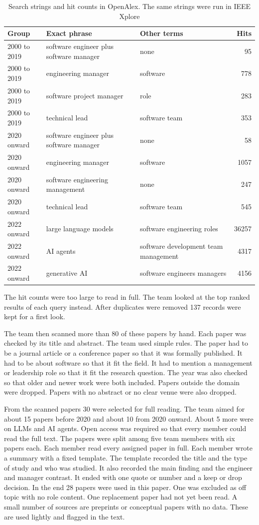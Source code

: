 \documentclass[conference]{IEEEtran}
\begin{document}
\begin{table}[!t]
\caption{Search strings and hit counts in OpenAlex. The same strings were run in IEEE Xplore}
\centering\footnotesize
\begin{tabular}{p{1.4cm}p{3cm}p{2.1cm}r}
\hline
Group & Exact phrase & Other terms & Hits \\ \hline
2000 to 2019 & software engineer plus software manager & none & 95 \\
2000 to 2019 & engineering manager & software & 778 \\
2000 to 2019 & software project manager & role & 283 \\
2000 to 2019 & technical lead & software team & 353 \\
2020 onward & software engineer plus software manager & none & 58 \\
2020 onward & engineering manager & software & 1057 \\
2020 onward & software engineering management & none & 247 \\
2020 onward & technical lead & software team & 545 \\
2022 onward & large language models & software engineering roles & 36257 \\
2022 onward & AI agents & software development team management & 4317 \\
2022 onward & generative AI & software engineers managers & 4156 \\
\hline
\end{tabular}
\end{table}

The hit counts were too large to read in full. The team looked at the top ranked results of each query instead. After duplicates were removed 137 records were kept for a first look.

The team then scanned more than 80 of these papers by hand. Each paper was checked by its title and abstract. The team used simple rules. The paper had to be a journal article or a conference paper so that it was formally published. It had to be about software so that it fit the field. It had to mention a management or leadership role so that it fit the research question. The year was also checked so that older and newer work were both included. Papers outside the domain were dropped. Papers with no abstract or no clear venue were also dropped.

From the scanned papers 30 were selected for full reading. The team aimed for about 15 papers before 2020 and about 10 from 2020 onward. About 5 more were on LLMs and AI agents. Open access was required so that every member could read the full text. The papers were split among five team members with six papers each. Each member read every assigned paper in full. Each member wrote a summary with a fixed template. The template recorded the title and the type of study and who was studied. It also recorded the main finding and the engineer and manager contrast. It ended with one quote or number and a keep or drop decision. In the end 28 papers were used in this paper. One was excluded as off topic with no role content. One replacement paper had not yet been read. A small number of sources are preprints or conceptual papers with no data. These are used lightly and flagged in the text.
\end{document}
